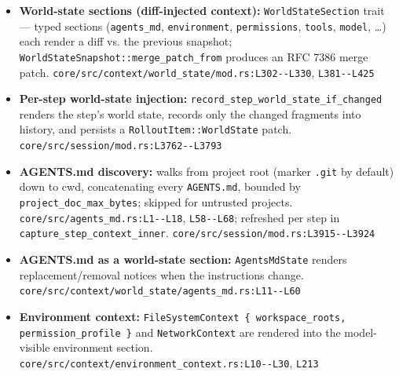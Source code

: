\begin{itemize}
\item \textbf{World-state sections (diff-injected context):} \texttt{WorldStateSection} trait --- typed sections (\texttt{agents\_\allowbreak{}md}, \texttt{environment}, \texttt{permissions}, \texttt{tools}, \texttt{model}, \ldots{}) each render a diff vs. the previous snapshot; \texttt{WorldStateSnapshot:\allowbreak{}:\allowbreak{}merge\_\allowbreak{}patch\_\allowbreak{}from} produces an RFC 7386 merge patch. \texttt{core/\allowbreak{}src/\allowbreak{}context/\allowbreak{}world\_\allowbreak{}state/\allowbreak{}mod.\allowbreak{}rs:\allowbreak{}L302-\allowbreak{}-\allowbreak{}L330}, \texttt{L381-\allowbreak{}-\allowbreak{}L425}
\item \textbf{Per-step world-state injection:} \texttt{record\_\allowbreak{}step\_\allowbreak{}world\_\allowbreak{}state\_\allowbreak{}if\_\allowbreak{}changed} renders the step's world state, records only the changed fragments into history, and persists a \texttt{RolloutItem:\allowbreak{}:\allowbreak{}WorldState} patch. \texttt{core/\allowbreak{}src/\allowbreak{}session/\allowbreak{}mod.\allowbreak{}rs:\allowbreak{}L3762-\allowbreak{}-\allowbreak{}L3793}
\item \textbf{AGENTS.md discovery:} walks from project root (marker \texttt{.\allowbreak{}git} by default) down to cwd, concatenating every \texttt{AGENTS.\allowbreak{}md}, bounded by \texttt{project\_\allowbreak{}doc\_\allowbreak{}max\_\allowbreak{}bytes}; skipped for untrusted projects. \texttt{core/\allowbreak{}src/\allowbreak{}agents\_\allowbreak{}md.\allowbreak{}rs:\allowbreak{}L1-\allowbreak{}-\allowbreak{}L18}, \texttt{L58-\allowbreak{}-\allowbreak{}L68}; refreshed per step in \texttt{capture\_\allowbreak{}step\_\allowbreak{}context\_\allowbreak{}inner}. \texttt{core/\allowbreak{}src/\allowbreak{}session/\allowbreak{}mod.\allowbreak{}rs:\allowbreak{}L3915-\allowbreak{}-\allowbreak{}L3924}
\item \textbf{AGENTS.md as a world-state section:} \texttt{AgentsMdState} renders replacement/removal notices when the instructions change. \texttt{core/\allowbreak{}src/\allowbreak{}context/\allowbreak{}world\_\allowbreak{}state/\allowbreak{}agents\_\allowbreak{}md.\allowbreak{}rs:\allowbreak{}L11-\allowbreak{}-\allowbreak{}L60}
\item \textbf{Environment context:} \texttt{FileSystemContext \{ workspace\_\allowbreak{}roots, permission\_\allowbreak{}profile \}} and \texttt{NetworkContext} are rendered into the model-visible environment section. \texttt{core/\allowbreak{}src/\allowbreak{}context/\allowbreak{}environment\_\allowbreak{}context.\allowbreak{}rs:\allowbreak{}L10-\allowbreak{}-\allowbreak{}L30}, \texttt{L213}

\end{itemize}
